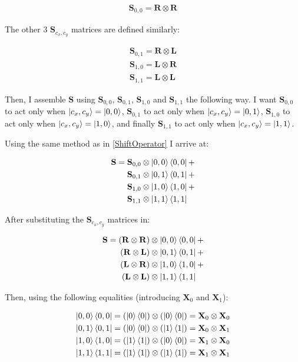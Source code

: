 \begin{align*}
    \mathbf{S}_{0,0} =  \mathbf{R} \otimes \mathbf{R}
\end{align*}

The other $3$ $\mathbf{S}_{c_x,c_y}$ matrices are defined similarly: 

\begin{align*}
    \mathbf{S}_{0,1} =  \mathbf{R} \otimes \mathbf{L}\\
    \mathbf{S}_{1,0} =  \mathbf{L} \otimes \mathbf{R}\\
    \mathbf{S}_{1,1} =  \mathbf{L} \otimes \mathbf{L}
\end{align*}

Then, I assemble $\mathbf{S}$ using $\mathbf{S}_{0,0}$, $\mathbf{S}_{0,1}$, $\mathbf{S}_{1,0}$ and $\mathbf{S}_{1,1}$ the following way. I want $\mathbf{S}_{0,0}$ to act only when $\ket{c_x,c_y} = \ket{0,0}$, $\mathbf{S}_{0,1}$ to act only when $\ket{c_x,c_y} = \ket{0,1}$, $\mathbf{S}_{1,0}$ to act only when $\ket{c_x,c_y} = \ket{1,0}$, and finally $\mathbf{S}_{1,1}$ to act only when $\ket{c_x,c_y} = \ket{1,1}$.

Using the same method as in \ref{ShiftOperator} I arrive at:

\begin{align*}
    \mathbf{S} =
    \mathbf{S}_{0,0} \otimes \ket{0,0}\bra{0,0} + \\
    \mathbf{S}_{0,1} \otimes \ket{0,1}\bra{0,1} + \\
    \mathbf{S}_{1,0} \otimes \ket{1,0}\bra{1,0} + \\
    \mathbf{S}_{1,1} \otimes \ket{1,1}\bra{1,1}\phantom{+}
\end{align*}

After substituting the $\mathbf{S}_{c_x,c_y}$ matrices in:

\begin{align*} 
    \mathbf{S} =   
    (\mathbf{R} \otimes \mathbf{R}) \otimes \ket{0,0}\bra{0,0} + \\
    (\mathbf{R} \otimes \mathbf{L}) \otimes \ket{0,1}\bra{0,1} + \\
    (\mathbf{L} \otimes \mathbf{R}) \otimes \ket{1,0}\bra{1,0} + \\
    (\mathbf{L} \otimes \mathbf{L}) \otimes \ket{1,1}\bra{1,1}\phantom{+}
\end{align*}

Then, using the following equalities (introducing $\mathbf{X}_0$ and $\mathbf{X}_1$):

\begin{align*} 
    \ket{0,0}\bra{0,0} = (\ket{0}\bra{0}) \otimes (\ket{0}\bra{0}) = \mathbf{X}_0 \otimes \mathbf{X}_0 \\
    \ket{0,1}\bra{0,1} = (\ket{0}\bra{0}) \otimes (\ket{1}\bra{1}) = \mathbf{X}_0 \otimes \mathbf{X}_1 \\
    \ket{1,0}\bra{1,0} = (\ket{1}\bra{1}) \otimes (\ket{0}\bra{0}) = \mathbf{X}_1 \otimes \mathbf{X}_0 \\
    \ket{1,1}\bra{1,1} = (\ket{1}\bra{1}) \otimes (\ket{1}\bra{1}) = \mathbf{X}_1 \otimes \mathbf{X}_1
\end{align*}

